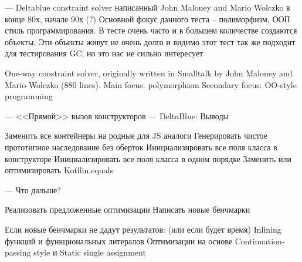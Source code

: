 ---
Deltablue
constraint solver написанный John Maloney and Mario Wolczko в конце 80х, начале 90х (?)
Основной фокус данного теста -- полиморфизм, ООП стиль программирования. В тесте очень часто и в большем количестве создаются объекты. Эти объекты живут не очень долго и видимо этот тест так же подходит для тестирования GC, но это нас не сильно интересует

One-way constraint solver, originally written in Smalltalk by John Maloney and Mario Wolczko (880 lines).
Main focus: polymorphism
Secondary focus: OO-style programming

---
<<Прямой>> вызов конструкторов
---
DeltaBlue: Выводы

Заменить все контейнеры на родные для JS аналоги
Генерировать чистое прототипное наследование без оберток
Инициализировать все поля класса в конструкторе
Инициализировать все поля класса в одном порядке
Заменить или оптимизировать Kotllin.equals

---
Что дальше?

Реализовать предложенные оптимизации
Написать новые бенчмарки

Если новые бенчмарки не дадут результатов: (или если будет время)
Inlining функций и функциональных литералов
Оптимизации на основе  Continuation-passing style и 
Static single assignment
